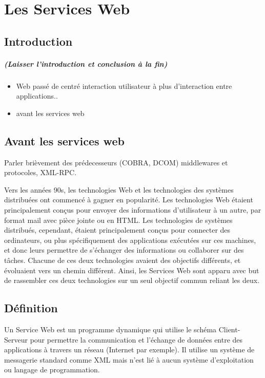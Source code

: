 	\chapter{Les Services Web}
	\newpage
		\section{Introduction} 
			\paragraph{(Laisser l'introduction et conclusion à la fin)}
			\begin{itemize}
			\item Web passé de centré interaction utilisateur à plus d'interaction entre applications..
			\item avant les services web
			\end{itemize}
		
		\section{Avant les services web}
		Parler brièvement des prédecesseurs (COBRA, DCOM) middlewares et protocoles, XML-RPC.\newline
		
		Vers les années 90s, les technologies Web et les technologies des systèmes distribuées ont commencé à gagner en popularité. Les technologies Web étaient principalement conçus pour envoyer des informations d'utilisateur à un autre, par format mail avec pièce jointe ou en HTML. Les technologies de systèmes distribués, cependant, étaient principalement conçus pour connecter des ordinateurs, ou plus spécifiquement des applications exécutées sur ces machines, et donc leurs permettre de s'échanger des informations ou collaborer sur des tâches.
		Chacune de ces deux technologies avaient des objectifs différents, et évoluaient vers un chemin différent. Ainsi, les Services Web sont apparu avec but de rassembler ces deux technologies sur un seul objectif commun reliant les deux.\cite{W3Road}

		\section{Définition}
		Un Service Web est un programme dynamique qui utilise le schéma Client-Serveur pour permettre la communication et l'échange de données entre des applications à travers un réseau (Internet par exemple).
		Il utilise un système de messagerie standard comme XML mais n'est lié à aucun système d'exploitation ou langage de programmation.

